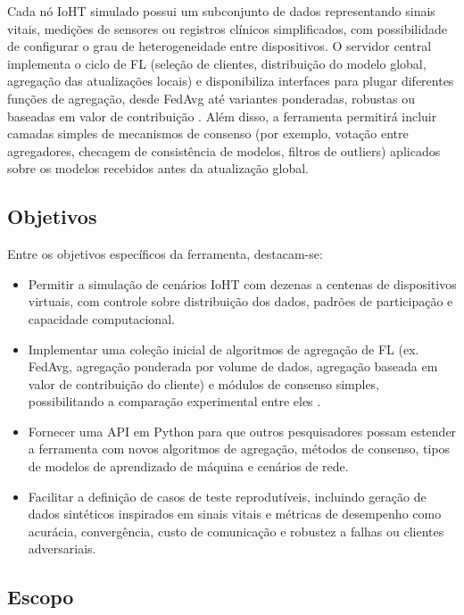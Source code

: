 \documentclass[12pt]{article}
\begin{document}
Cada nó IoHT simulado possui um subconjunto de dados representando sinais vitais, medições de sensores ou registros clínicos simplificados, com possibilidade de configurar o grau de heterogeneidade entre dispositivos. O servidor central implementa o ciclo de FL (seleção de clientes, distribuição do modelo global, agregação das atualizações locais) e disponibiliza interfaces para plugar diferentes funções de agregação, desde FedAvg até variantes ponderadas, robustas ou baseadas em valor de contribuição \cite{Zhao2022_FLIoTDataValue}. Além disso, a ferramenta permitirá incluir camadas simples de mecanismos de consenso (por exemplo, votação entre agregadores, checagem de consistência de modelos, filtros de outliers) aplicados sobre os modelos recebidos antes da atualização global.

\subsection{Objetivos}

Entre os objetivos específicos da ferramenta, destacam-se:

\begin{itemize}
    \item Permitir a simulação de cenários IoHT com dezenas a centenas de dispositivos virtuais, com controle sobre distribuição dos dados, padrões de participação e capacidade computacional.
    \item Implementar uma coleção inicial de algoritmos de agregação de FL (ex. FedAvg, agregação ponderada por volume de dados, agregação baseada em valor de contribuição do cliente) e módulos de consenso simples, possibilitando a comparação experimental entre eles \cite{Zhao2022_FLIoTDataValue,Nevrataki2023_SurveyFLApplications}.
    \item Fornecer uma API em Python para que outros pesquisadores possam estender a ferramenta com novos algoritmos de agregação, métodos de consenso, tipos de modelos de aprendizado de máquina e cenários de rede.
    \item Facilitar a definição de casos de teste reprodutíveis, incluindo geração de dados sintéticos inspirados em sinais vitais e métricas de desempenho como acurácia, convergência, custo de comunicação e robustez a falhas ou clientes adversariais.
\end{itemize}

\subsection{Escopo}
\end{document}
